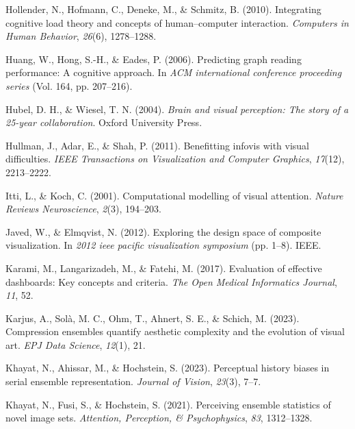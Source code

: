 \documentclass[print]{nuthesis}
\newlength{\cslhangindent}
\newenvironment{CSLReferences}[2]%
{\setlength{\parindent}{0pt}%
\everypar{\setlength{\hangindent}{\cslhangindent}}\ignorespaces}%
{\par}
\begin{document}
\begin{CSLReferences}{1}{0}
\leavevmode{}%
Hollender, N., Hofmann, C., Deneke, M., \& Schmitz, B. (2010). Integrating cognitive load theory and concepts of human--computer interaction. \emph{Computers in Human Behavior}, \emph{26}(6), 1278--1288.

\leavevmode{}%
Huang, W., Hong, S.-H., \& Eades, P. (2006). Predicting graph reading performance: A cognitive approach. In \emph{ACM international conference proceeding series} (Vol. 164, pp. 207--216).

\leavevmode{}%
Hubel, D. H., \& Wiesel, T. N. (2004). \emph{Brain and visual perception: The story of a 25-year collaboration}. Oxford University Press.

\leavevmode{}%
Hullman, J., Adar, E., \& Shah, P. (2011). Benefitting infovis with visual difficulties. \emph{IEEE Transactions on Visualization and Computer Graphics}, \emph{17}(12), 2213--2222.

\leavevmode{}%
Itti, L., \& Koch, C. (2001). Computational modelling of visual attention. \emph{Nature Reviews Neuroscience}, \emph{2}(3), 194--203.

\leavevmode{}%
Javed, W., \& Elmqvist, N. (2012). Exploring the design space of composite visualization. In \emph{2012 ieee pacific visualization symposium} (pp. 1--8). IEEE.

\leavevmode{}%
Karami, M., Langarizadeh, M., \& Fatehi, M. (2017). Evaluation of effective dashboards: Key concepts and criteria. \emph{The Open Medical Informatics Journal}, \emph{11}, 52.

\leavevmode{}%
Karjus, A., Solà, M. C., Ohm, T., Ahnert, S. E., \& Schich, M. (2023). Compression ensembles quantify aesthetic complexity and the evolution of visual art. \emph{EPJ Data Science}, \emph{12}(1), 21.

\leavevmode{}%
Khayat, N., Ahissar, M., \& Hochstein, S. (2023). Perceptual history biases in serial ensemble representation. \emph{Journal of Vision}, \emph{23}(3), 7--7.

\leavevmode{}%
Khayat, N., Fusi, S., \& Hochstein, S. (2021). Perceiving ensemble statistics of novel image sets. \emph{Attention, Perception, \& Psychophysics}, \emph{83}, 1312--1328.


\end{CSLReferences}
\end{document}
